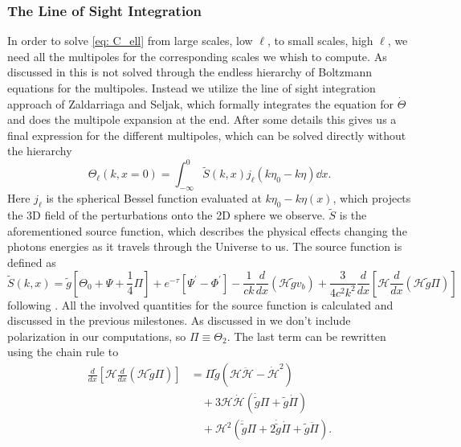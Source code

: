 \documentclass[10pt,a4paper]{article}
\providecommand{\gtilde}
{
  \ensuremath{
    \tilde{g}
  }
}
\providecommand{\hprime}
{
  \ensuremath{
    \mathcal{H}
  }
}
\begin{document}
\subsubsection{The Line of Sight Integration}
\label{subsubsec:Theory/LOS int}
In order to solve \cref{eq: C_ell} from large scales, low $\ell$, to small scales, high $\ell$, we need all the multipoles for the corresponding scales we whish to compute. As discussed in \cite{milestone3} this is not solved through the endless hierarchy of Boltzmann equations for the multipoles. Instead we utilize the line of sight integration approach of Zaldarriaga and Seljak, which formally integrates the equation for $\dot{\Theta}$ and does the multipole expansion at the end. After some details this gives us a final expression for the different multipoles, which can be solved directly without the hierarchy
\begin{equation}
  \Theta_\ell (k, x=0) = \int_{-\infty}^0 \tilde{S}(k,x)j_\ell\left(k\eta_0 - k\eta\right)\dd{x}.
  \label{eq: LOS integration}
\end{equation}
Here $j_\ell$ is the spherical Bessel function evaluated at $k\eta_0 - k\eta(x)$, which projects the 3D field of the perturbations onto the 2D sphere we observe. $\tilde{S}$ is the aforementioned source function, which describes the physical effects changing the photons energies as it travels through the Universe to us. The source function is defined as 
\begin{equation}
  \tilde{S}(k,x) = \tilde{g}\left[ \Theta_0 + \Psi + \frac{1}{4}\Pi\right] +
  e^{-\tau} \left[\Psi^\prime-\Phi^\prime\right] -
  \frac{1}{ck}\frac{d}{dx}(\mathcal{H}\tilde{g}v_b) + \frac{3}{4c^2k^2} \frac{d}{dx}
  \left[\mathcal{H}\frac{d}{dx} (\mathcal{H}\tilde{g}\Pi)\right]
\end{equation}
following \cite{Calin}. All the involved quantities for the source function is calculated and discussed in the previous milestones. As discussed in \cite{milestone3} we don't include polarization in our computations, so $\Pi \equiv \Theta_2$. The last term can be rewritten using the chain rule to
\begin{align*}
  \frac{d}{dx}
  \left[\mathcal{H}\frac{d}{dx} (\mathcal{H}\tilde{g}\Pi)\right] &= \Pi \gtilde \left(\hprime \ddot{\hprime} - \dot{\hprime}^2\right) \\
  &\quad + 3\hprime\dot{\hprime}\left(\dot{\gtilde}\Pi+\gtilde\dot{\Pi}\right)\\
  &\quad + \hprime^2\left(\ddot{\gtilde}\Pi + 2\dot{\gtilde}\dot{\Pi} + \gtilde\ddot{\Pi}\right).
\end{align*}
\end{document}

